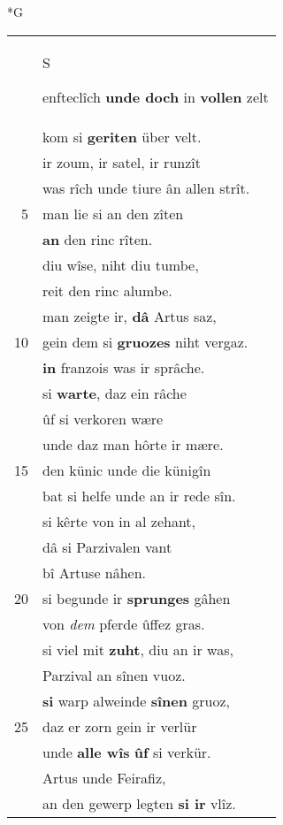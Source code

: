 \documentclass[8pt,a4paper,notitlepage]{article}
\begin{document}
\newpage
\begin{table}[ht]
\begin{minipage}[t]{0.5\linewidth}
\small
\begin{center}*G
\end{center}
\begin{tabular}{rl}
 & \begin{large}S\end{large}enfteclîch \textbf{unde doch} in \textbf{vollen} zelt\\ 
 & kom si \textbf{geriten} über velt.\\ 
 & ir zoum, ir satel, ir runzît\\ 
 & was rîch unde tiure ân allen strît.\\ 
5 & man lie si an den zîten\\ 
 & \textbf{an} den rinc rîten.\\ 
 & diu wîse, niht diu tumbe,\\ 
 & reit den rinc alumbe.\\ 
 & man zeigte ir, \textbf{dâ} Artus saz,\\ 
10 & gein dem si \textbf{gruozes} niht vergaz.\\ 
 & \textbf{in} franzois was ir sprâche.\\ 
 & si \textbf{warte}, daz ein râche\\ 
 & ûf si verkoren wære\\ 
 & unde daz man hôrte ir mære.\\ 
15 & den künic unde die künigîn\\ 
 & bat si helfe unde an ir rede sîn.\\ 
 & si kêrte von in al zehant,\\ 
 & dâ si Parzivalen vant\\ 
 & bî Artuse nâhen.\\ 
20 & si begunde ir \textbf{sprunges} gâhen\\ 
 & von \textit{dem} pferde ûffez gras.\\ 
 & si viel mit \textbf{zuht}, diu an ir was,\\ 
 & Parzival an sînen vuoz.\\ 
 & \textbf{si} warp alweinde \textbf{sînen} gruoz,\\ 
25 & daz er zorn gein ir verlür\\ 
 & unde \textbf{alle wîs} \textbf{ûf} si verkür.\\ 
 & Artus unde Feirafiz,\\ 
 & an den gewerp legten \textbf{si ir} vlîz.\\ 

\end{tabular}
\end{minipage}
\end{table}
\end{document}
